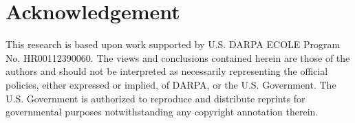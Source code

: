 \section*{Acknowledgement}
This research is based upon work supported by U.S. DARPA ECOLE Program No. HR00112390060. The views and conclusions contained herein are those of the authors and should not be interpreted as necessarily representing the official policies, either expressed or implied, of DARPA, or the U.S. Government. The U.S. Government is authorized to reproduce and distribute reprints for governmental purposes notwithstanding any copyright annotation therein.


